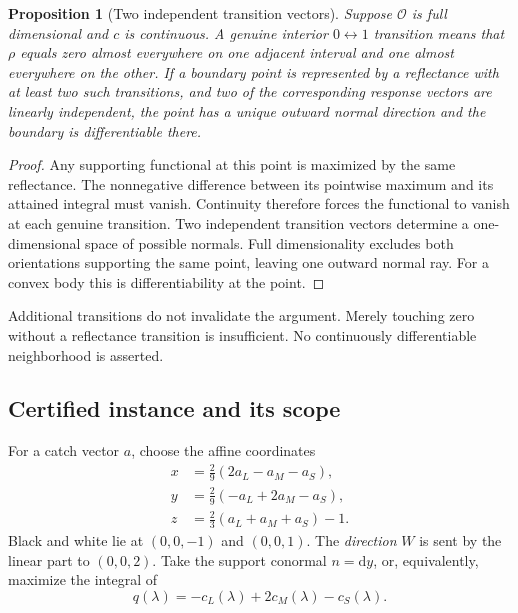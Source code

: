 \documentclass[11pt,letterpaper]{article}
\theoremstyle{plain}
\newtheorem{proposition}{Proposition}
\newcommand{\dd}{\mathrm{d}}
\begin{document}
\begin{proposition}[Two independent transition vectors]
\label{prop:transition-normal}
Suppose $\mathcal O$ is full dimensional and $c$ is continuous. A genuine interior $0\leftrightarrow1$ transition means that $\rho$ equals zero almost everywhere on one adjacent interval and one almost everywhere on the other. If a boundary point is represented by a reflectance with at least two such transitions, and two of the corresponding response vectors are linearly independent, the point has a unique outward normal direction and the boundary is differentiable there.
\end{proposition}
\begin{proof}
Any supporting functional at this point is maximized by the same reflectance. The nonnegative difference between its pointwise maximum and its attained integral must vanish. Continuity therefore forces the functional to vanish at each genuine transition. Two independent transition vectors determine a one-dimensional space of possible normals. Full dimensionality excludes both orientations supporting the same point, leaving one outward normal ray. For a convex body this is differentiability at the point.
\end{proof}
Additional transitions do not invalidate the argument. Merely touching zero without a reflectance transition is insufficient. No continuously differentiable neighborhood is asserted.

\subsection{Certified instance and its scope}
For a catch vector $a$, choose the affine coordinates
\begin{equation}
 \begin{aligned}
 x&=\tfrac29(2a_L-a_M-a_S),\\
 y&=\tfrac29(-a_L+2a_M-a_S),\\
 z&=\tfrac23(a_L+a_M+a_S)-1.
 \end{aligned}
 \label{eq:object-chart}
\end{equation}
Black and white lie at $(0,0,-1)$ and $(0,0,1)$. The \emph{direction} $W$ is sent by the linear part to $(0,0,2)$. Take the support conormal $n=\dd y$, or, equivalently, maximize the integral of
\begin{equation}
 q(\lambda)=-c_L(\lambda)+2c_M(\lambda)-c_S(\lambda).
 \label{eq:object-cost}
\end{equation}
\end{document}
